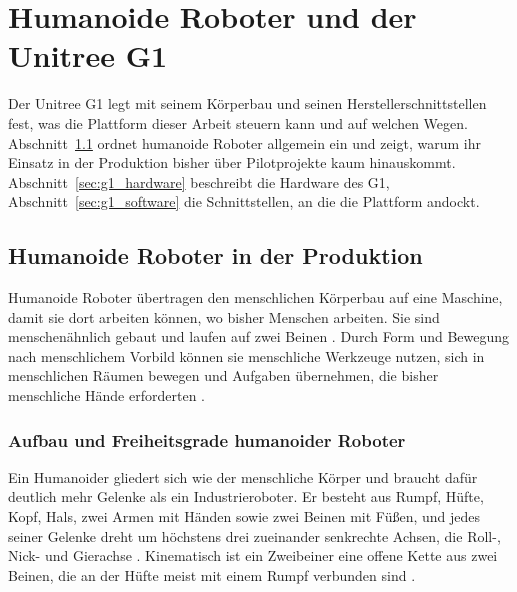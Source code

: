 \chapter{Humanoide Roboter und der Unitree G1}
\label{chap:humanoide}
Der Unitree G1 legt mit seinem Körperbau und seinen Herstellerschnittstellen fest, was die Plattform dieser Arbeit steuern kann und auf welchen Wegen.
Abschnitt~\ref{sec:humanoide_produktion} ordnet humanoide Roboter allgemein ein und zeigt, warum ihr Einsatz in der Produktion bisher über Pilotprojekte kaum hinauskommt.
Abschnitt~\ref{sec:g1_hardware} beschreibt die Hardware des G1, Abschnitt~\ref{sec:g1_software} die Schnittstellen, an die die Plattform andockt.

\section{Humanoide Roboter in der Produktion}
\label{sec:humanoide_produktion}
Humanoide Roboter übertragen den menschlichen Körperbau auf eine Maschine, damit sie dort arbeiten können, wo bisher Menschen arbeiten.
Sie sind menschenähnlich gebaut und laufen auf zwei Beinen \cite{Saeedvand2019}.
Durch Form und Bewegung nach menschlichem Vorbild können sie menschliche Werkzeuge nutzen, sich in menschlichen Räumen bewegen und Aufgaben übernehmen, die bisher menschliche Hände erforderten \cite{Prather2025}.

\subsection{Aufbau und Freiheitsgrade humanoider Roboter}
\label{sec:humanoide_aufbau}
Ein Humanoider gliedert sich wie der menschliche Körper und braucht dafür deutlich mehr Gelenke als ein Industrieroboter.
Er besteht aus Rumpf, Hüfte, Kopf, Hals, zwei Armen mit Händen sowie zwei Beinen mit Füßen, und jedes seiner Gelenke dreht um höchstens drei zueinander senkrechte Achsen, die Roll-, Nick- und Gierachse \cite{Saeedvand2019}.
Kinematisch ist ein Zweibeiner eine offene Kette aus zwei Beinen, die an der Hüfte meist mit einem Rumpf verbunden sind \cite{Westervelt2018}.

